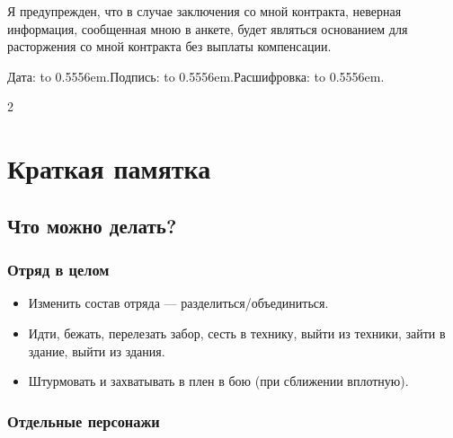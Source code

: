 \documentclass{article}
\providecommand{\fillinline}[1]{
  \leavevmode\leaders\hbox to 0.5556em{\hss.\hss}\hfill\kern0pt}
\begin{document}
Я предупрежден, что в случае заключения со мной контракта, неверная информация, сообщенная мною в анкете, будет являться основанием для расторжения со мной контракта без выплаты компенсации.

Дата:\fillinline{}Подпись:\fillinline{}Расшифровка:\fillinline{}

\clearpage

\begin{multicols}{2}
\raggedcolumns{}

\section{Краткая памятка}\label{quick-reference}
\thispagestyle{empty}

\subsection{Что можно делать?}\label{what-can-be-done}

\subsubsection{Отряд в целом}\label{squad-as-a-whole}

\begin{itemize}
\item
  Изменить состав отряда --- разделиться/объединиться.
\item
  Идти, бежать, перелезать забор, сесть в технику, выйти из техники, зайти в здание, выйти из здания.
\item
  Штурмовать и захватывать в плен в бою (при сближении вплотную).
\end{itemize}

\subsubsection{Отдельные персонажи}\label{individual-characters}


\end{multicols}
\end{document}
